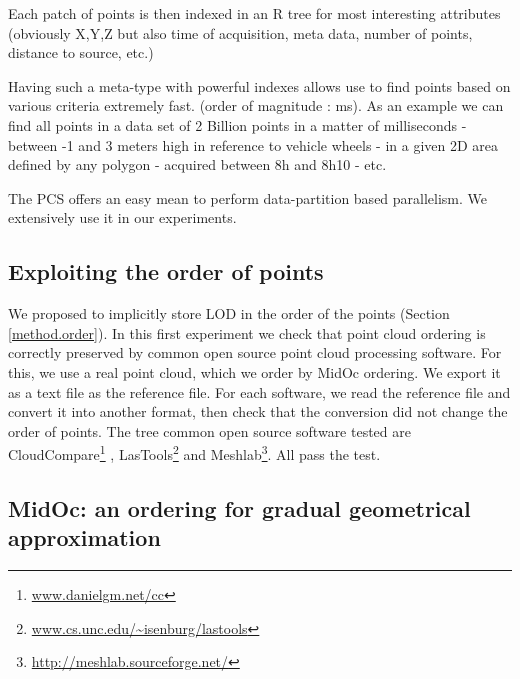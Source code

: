 		Each patch of points is then indexed in an R tree for most interesting attributes (obviously X,Y,Z but also time of acquisition, meta data, number of points, distance to source, etc.)
			
		Having such a meta-type with powerful indexes allows use to find points based on various criteria extremely fast. (order of magnitude : ms). 
		As an example we can find all points in a data set of 2 Billion points in a matter of milliseconds 
		 - between -1 and 3 meters high in reference to vehicle wheels
		 - in a given 2D area defined by any polygon 
		 - acquired between 8h and 8h10 - etc.
		 
		The PCS offers an easy mean to perform data-partition based parallelism. We extensively use it in our experiments. 


	\subsection{Exploiting the order of points}
		\label{result.os_softwares}
		We proposed to implicitly store LOD in the order of the points (Section \ref{method.order}).
		In this first experiment we check that point cloud ordering is correctly preserved by common open source point cloud processing software.
		For this, we use a real point cloud, which we order by MidOc ordering. 
		We export it as a text file as the reference file.
		For each software, we read the reference file and convert it into another format, then check that the conversion did not change the order of points. 
		The tree common open source software tested are CloudCompare\footnote{\url{www.danielgm.net/cc}}
		, LasTools\footnote{\url{www.cs.unc.edu/~isenburg/lastools}} and Meshlab\footnote{\url{http://meshlab.sourceforge.net/}}.
		All pass the test.
			
	\subsection{MidOc: an ordering for gradual geometrical approximation}
		
